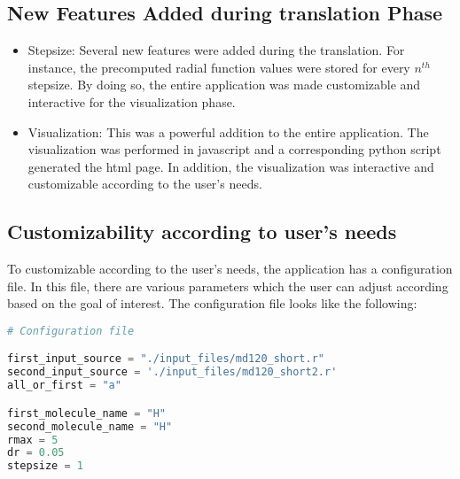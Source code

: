 \subsection*{New Features Added during translation Phase}

\begin{itemize}

\item Stepsize: Several new features were added during the translation. For instance, the precomputed radial function values were stored for every $n^{th}$ stepsize. By doing so, the entire application was made customizable and interactive for the visualization phase. 

\item Visualization: This was a powerful addition to the entire application. The visualization was performed in javascript and a corresponding python script generated the html page. In addition, the visualization was interactive and customizable according to the user's needs.

\end{itemize}

\subsection*{Customizability according to user's needs}

To customizable according to the user's needs, the application has a configuration file. In this file, there are various parameters which the user can adjust according based on the goal of interest. The configuration file looks like the following:


\begin{lstlisting}[language=Python, caption=Config file for setting parameters during the run.]
# Configuration file

first_input_source = "./input_files/md120_short.r"
second_input_source = './input_files/md120_short2.r'
all_or_first = "a"

first_molecule_name = "H"
second_molecule_name = "H"
rmax = 5
dr = 0.05
stepsize = 1
\end{lstlisting}


